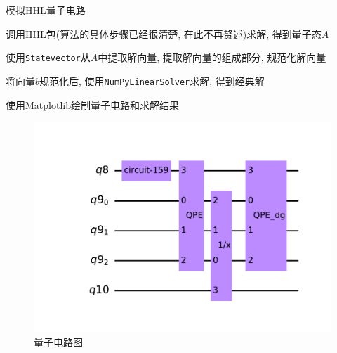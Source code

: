 \begin{algorithm}[H]
	\caption{模拟HHL量子电路}
	
	\BlankLine
	调用HHL包(算法的具体步骤已经很清楚, 在此不再赘述)求解, 得到量子态$A$\;
	
	使用\texttt{Statevector}从$A$中提取解向量, 提取解向量的组成部分, 
	规范化解向量\;
	
	\BlankLine
	将向量$b$规范化后, 使用\texttt{NumPyLinearSolver}求解, 得到经典解\;
	
	\BlankLine
	使用Matplotlib绘制量子电路和求解结果\;
	
	
\end{algorithm}



\begin{figure}[h]
	\centering
	\begin{minipage}{0.65\linewidth}
		\includegraphics[width=\linewidth]{HHL.pdf}
		\caption{量子电路图}
	\end{minipage}
\end{figure}








